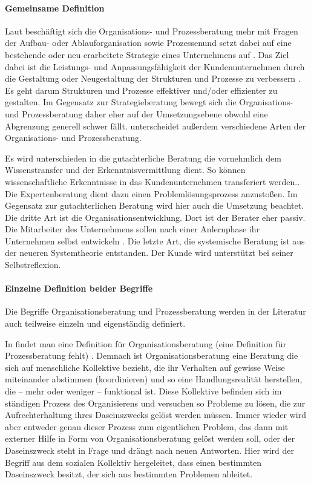 \paragraph*{Gemeinsame Definition}
Laut \cite[63]{Lippold201309} beschäftigt sich die Organisations- und Prozessberatung mehr \glqq mit Fragen der Aufbau- oder Ablauforganisation sowie Prozessen\grqq und setzt dabei auf eine \glqq bestehende oder neu erarbeitete Strategie eines Unternehmens auf \grqq. Das Ziel \glqq dabei ist die Leistungs- und Anpassungsfähigkeit der Kundenunternehmen durch die Gestaltung oder Neugestaltung der Strukturen und Prozesse zu verbessern \grqq. Es geht darum Strukturen und Prozesse \glqq effektiver und/oder effizienter \grqq zu gestalten. Im Gegensatz zur Strategieberatung bewegt sich die Organisations- und Prozessberatung daher eher auf der Umsetzungsebene obwohl eine Abgrenzung generell schwer fällt. \cite[63]{Lippold201309} unterscheidet außerdem verschiedene Arten der Organisations- und Prozessberatung.

Es wird unterschieden in die gutachterliche Beratung die \glqq vornehmlich dem Wissenstransfer und der Erkenntnisvermittlung \grqq dient. So können \glqq wissenschaftliche Erkenntnisse in das Kundenunternehmen transferiert werden.\grqq . Die Expertenberatung dient dazu einen \glqq Problemlösungsprozess \grqq anzustoßen. Im Gegensatz zur gutachterlichen Beratung wird hier auch die Umsetzung beachtet. Die dritte Art ist die Organisationsentwicklung. Dort ist der Berater \glqq eher passiv\grqq. 
Die Mitarbeiter des Unternehmens sollen nach einer Anlernphase ihr Unternehmen selbst \glqq entwickeln \grqq . 
Die letzte Art, die systemische Beratung ist aus der neueren Systemtheorie entstanden. Der Kunde wird unterstützt \glqq bei seiner Selbstreflexion\grqq. 

\paragraph*{Einzelne Definition beider Begriffe}
Die Begriffe Organisationsberatung und Prozessberatung werden in der Literatur auch teilweise einzeln und eigenständig definiert.

In \cite[28]{MuellerNagel} findet man eine Definition für Organisationsberatung (eine Definition für Prozessberatung fehlt) . Demnach ist Organisationsberatung eine Beratung die \glqq  sich auf menschliche Kollektive bezieht, die ihr Verhalten auf gewisse Weise miteinander abstimmen (koordinieren) und so eine Handlungsrealität herstellen, die – mehr oder weniger – funktional ist. Diese Kollektive befinden sich im ständigen Prozess des Organisierens und versuchen so Probleme zu lösen, die zur Aufrechterhaltung ihres Daseinszwecks gelöst werden müssen. Immer wieder wird aber entweder genau dieser Prozess zum eigentlichen Problem, das dann mit externer Hilfe in Form von Organisationsberatung gelöst werden soll, oder der Daseinszweck steht in Frage und drängt nach neuen Antworten.
\grqq Hier wird der Begriff aus dem sozialen Kollektiv hergeleitet, dass einen bestimmten Daseinszweck besitzt, der sich aus bestimmten Problemen ableitet.


